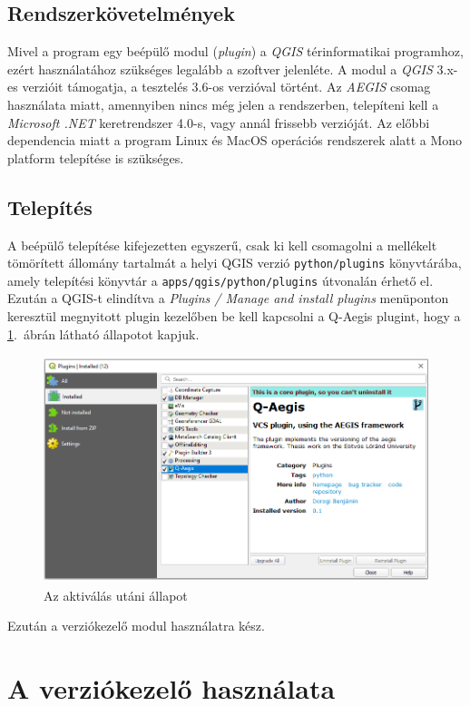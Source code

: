 \subsection{Rendszerkövetelmények}
Mivel a program egy beépülő modul (\emph{plugin}) a \emph{QGIS} térinformatikai programhoz, ezért használatához szükséges legalább a szoftver jelenléte. A modul a \emph{QGIS} 3.x-es verzióit támogatja, a tesztelés 3.6-os verzióval történt. Az \emph{AEGIS} csomag használata miatt, amennyiben nincs még jelen a rendszerben, telepíteni kell a \emph{Microsoft .NET} keretrendszer 4.0-s, vagy annál frissebb verzióját. Az előbbi dependencia miatt a program Linux és MacOS operációs rendszerek alatt a Mono platform telepítése is szükséges. 
\subsection{Telepítés}
A beépülő telepítése kifejezetten egyszerű, csak ki kell csomagolni a mellékelt tömörített állomány tartalmát a helyi QGIS verzió \texttt{python/plugins} könyvtárába, amely telepítési könyvtár a \texttt{apps/qgis/python/plugins} útvonalán érhető el. Ezután a QGIS-t elindítva a \emph{Plugins / Manage and install plugins} menüponton keresztül megnyitott plugin kezelőben be kell kapcsolni a Q-Aegis plugint, hogy a \ref{fig:picture-1}.~ábrán látható állapotot kapjuk.
\begin{figure}[H]
	\centering
	\includegraphics[width=\textwidth,height=250px]{images/enable_plugin}
	\caption{Az aktiválás utáni állapot}
	\label{fig:picture-1}
\end{figure}

Ezután a verziókezelő modul használatra kész.
	
\section{A verziókezelő használata}
